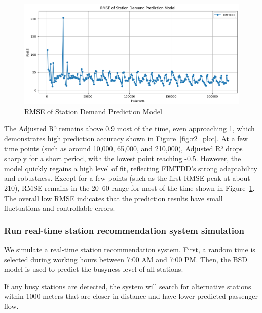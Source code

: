 \documentclass[11pt]{article} %
\begin{document}
\begin{figure}[H]
	\centering
	\caption{RMSE of Station Demand Prediction Model}
	\label{fig:rmse_plot}
	\includegraphics[scale=0.55]{rmse_plot}
\end{figure}

The Adjusted R² remains above 0.9 most of the time, even approaching 1, which demonstrates high prediction accuracy shown in Figure~\ref{fig:r2_plot}. At a few time points (such as around 10,000, 65,000, and 210,000), Adjusted R² drops sharply for a short period, with the lowest point reaching -0.5. However, the model quickly regains a high level of fit, reflecting FIMTDD's strong adaptability and robustness. Except for a few points (such as the first RMSE peak at about 210), RMSE remains in the 20–60 range for most of the time shown in Figure~\ref{fig:rmse_plot}. The overall low RMSE indicates that the prediction results have small fluctuations and controllable errors.


\subsubsection{Run real-time station recommendation system simulation}
We simulate a real-time station recommendation system. First, a random time is selected during working hours between 7:00 AM and 7:00 PM. Then, the BSD model is used to predict the busyness level of all stations.

If any busy stations are detected, the system will search for alternative stations within 1000 meters that are closer in distance and have lower predicted passenger flow.
\end{document}
